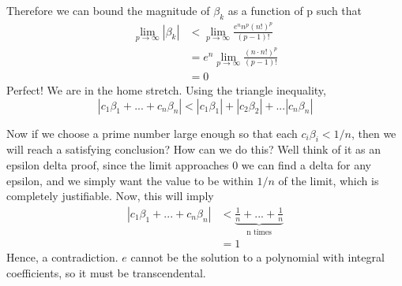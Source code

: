 \documentclass{article}
\begin{document}
Therefore we can bound the magnitude of $\beta_k$ as a function of p such that
\begin{equation*}
    \begin{split}
        \lim_{p\rightarrow \infty} \left|\beta_k\right|&< \lim_{p\rightarrow \infty} \frac{e^nn^p(n!)^p}{(p-1)!}\\
        &=e^n \lim_{p\rightarrow \infty} \frac{(n\cdot n!)^p}{(p-1)!}\\
        &= 0
    \end{split}
\end{equation*}
Perfect! We are in the home stretch. Using the triangle inequality,
\begin{equation*}
     \left|c_{1}\beta_{1}+...+c_{n}\beta_{n}\right|<\left|c_{1}\beta_{1}\right|+\left|c_{2}\beta_{2}\right|+...\left|c_{n}\beta_{n}\right|
\end{equation*} \par
Now if we choose a prime number large enough so that each $c_i\beta_i<1/n$, then we will reach a satisfying conclusion? How can we do this? Well think of it as an epsilon delta proof, since the limit approaches 0 we can find a delta for any epsilon, and we simply want the value to be within $1/n$ of the limit, which is completely justifiable. Now, this will imply
\begin{equation*}
    \begin{split}
          \left|c_{1}\beta_{1}+...+c_{n}\beta_{n}\right|&<\underbrace{\frac{1}{n}+...+\frac{1}{n}}_{\text{n times}} \\
          &= 1
    \end{split}
\end{equation*}
Hence, a contradiction. $e$ cannot be the solution to a polynomial with integral coefficients, so it must be transcendental. 
\end{document}
